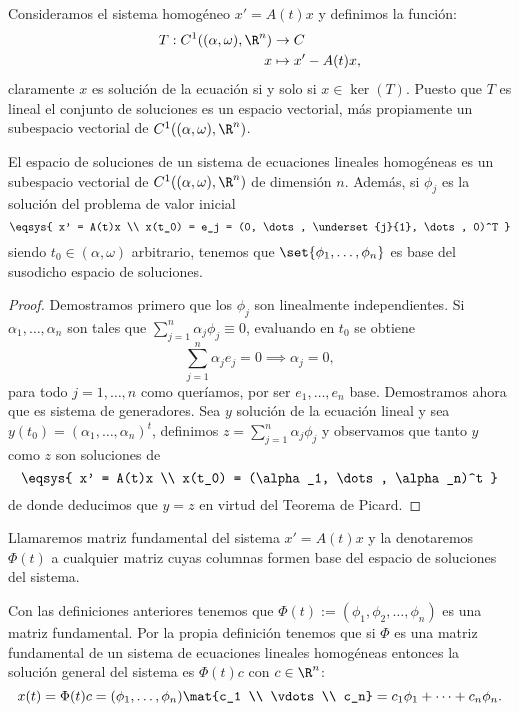 \documentclass[../main.tex]{subfiles}
\begin{document}
Consideramos el sistema homogéneo \(x' = A(t) x\) y definimos la función:
\begin{align*}
	T : C^1((\alpha, \omega), \R^n) &\to C \\
	x &\mapsto x' - A(t)x,
\end{align*}
claramente \(x\) es solución de la ecuación si y solo si \(x \in \ker(T)\).
Puesto que \(T\) es lineal el conjunto de soluciones es un espacio vectorial,
más propiamente un subespacio vectorial de \(C^1((\alpha, \omega), \R^n)\).

\begin{theorem}
	El espacio de soluciones de un sistema de ecuaciones lineales homogéneas es
	un subespacio vectorial de \(C^1((\alpha, \omega), \R^n)\) de dimensión 
	\(n\). Además, si \(\phi_j\) es la solución del problema de valor inicial
	\[\eqsys{
		x' = A(t)x \\
		x(t_0) = e_j = (0, \dots, \underset{j}{1}, \dots, 0)^T
		}\]
	siendo \(t_0 \in (\alpha, \omega)\) arbitrario, tenemos que
	\(\set{\phi_1, \dots, \phi_n}\) es base del susodicho espacio de soluciones.
\end{theorem}

\begin{proof}
	Demostramos primero que los \(\phi_j\) son linealmente independientes. Si
    \(\alpha_1, \dots, \alpha_n\) son tales que \(\sum_{j = 1}^n \alpha_j \phi_j
    \equiv 0\), evaluando en \(t_0\) se obtiene
	\[\sum_{j = 1}^n \alpha_j e_j = 0 \implies \alpha_j = 0,\]
	para todo \(j = 1, \dots, n\) como queríamos, por ser \(e_1, \dots,
    e_n\) base. Demostramos ahora que es sistema de generadores. Sea \(y\) solución
    de la ecuación lineal y sea \(y(t_0) = (\alpha_1, \dots, \alpha_n)^t\),
    definimos \(z = \sum_{j = 1}^n \alpha_j \phi_j\) y observamos que tanto
    \(y\) como \(z\) son soluciones de
	\[\eqsys{
		x' = A(t)x \\
		x(t_0) = (\alpha_1, \dots, \alpha_n)^t
		}\]
	de donde deducimos que \(y = z\) en virtud del Teorema de Picard.
\end{proof}

\begin{definition}
	Llamaremos matriz fundamental del sistema \(x' = A(t)x\) y la denotaremos
	\(\Phi(t)\) a cualquier matriz cuyas columnas formen base del espacio de 
	soluciones del sistema.
\end{definition}

Con las definiciones anteriores tenemos que
\(\Phi(t) := (\phi_1, \phi_2, \dots, \phi_n)\) es una matriz fundamental. Por la
propia definición tenemos que si \(\Phi\) es una matriz fundamental de un
sistema de ecuaciones lineales homogéneas entonces la solución general del
sistema es \(\Phi(t)c\) con \(c \in \R^n\):
\[x(t) = \Phi(t) c = (\phi_1, \dots, \phi_n) \mat{c_1 \\ \vdots \\ c_n} =
	c_1\phi_1 + \cdots + c_n\phi_n.\]
\end{document}
